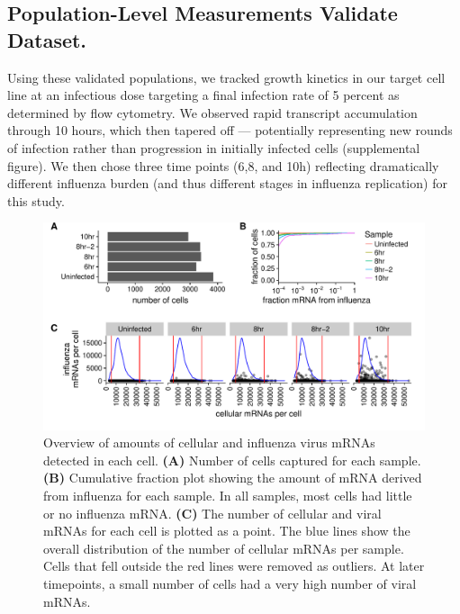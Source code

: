 \documentclass[9pt,lineno]{elife}
\begin{document}
\subsection{Population-Level Measurements Validate Dataset.}
Using these validated populations, we tracked growth kinetics in our target cell line at an infectious dose targeting a final infection rate of 5 percent as determined by flow cytometry. 
We observed rapid transcript accumulation through 10 hours, which then tapered off --- potentially representing new rounds of infection rather than progression in initially infected cells (supplemental figure). 
We then chose three time points (6,8, and 10h) reflecting dramatically different influenza burden (and thus different stages in influenza replication) for this study.

\begin{figure}
\includegraphics[width=\linewidth]{figures/p_cell_mRNA_summary.pdf}
\caption{\label{fig:cells}
Overview of amounts of cellular and influenza virus mRNAs detected in each cell.
{\bf (A)} 
Number of cells captured for each sample.
{\bf (B)} 
Cumulative fraction plot showing the amount of mRNA derived from influenza for each sample.
In all samples, most cells had little or no influenza mRNA.
{\bf (C)} 
The number of cellular and viral mRNAs for each cell is plotted as a point.
The blue lines show the overall distribution of the number of cellular mRNAs per sample.
Cells that fell outside the red lines were removed as outliers.
At later timepoints, a small number of cells had a very high number of viral mRNAs.
}
\end{figure}
\end{document}
